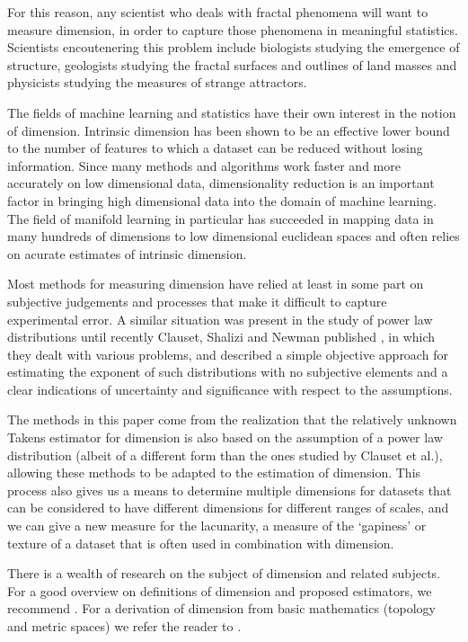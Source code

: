 \documentclass[11pt]{article}
\begin{document}
For this reason, any scientist who deals with fractal phenomena will want to measure dimension, in order to capture those phenomena in meaningful statistics. Scientists encoutenering this problem include biologists studying the emergence of structure, geologists studying the fractal surfaces and outlines of land masses and physicists studying the measures of strange attractors.

The fields of machine learning and statistics have their own interest in the notion of dimension. Intrinsic dimension has been shown to be an effective lower bound to the number of features to which a dataset can be reduced without losing information.\cite{kumaraswamy2008fractal} Since many methods and algorithms work faster and more accurately on low dimensional data, dimensionality reduction is an important factor in bringing high dimensional data into the domain of machine learning. The field of manifold learning in particular has succeeded in mapping data in many hundreds of dimensions to low dimensional euclidean spaces\cite{roweis2000nonlinear} and often relies on acurate estimates of intrinsic dimension.\cite{levina2004maximum} 

Most methods for measuring dimension have relied at least in some part on subjective judgements and processes that make it difficult to capture experimental error. A similar situation was present in the study of power law distributions until recently Clauset, Shalizi and Newman published \cite{clauset2007power}, in which they dealt with various problems, and described a simple objective approach for estimating the exponent of such distributions with no subjective elements and a clear indications of uncertainty and significance with respect to the assumptions.

The methods in this paper come from the realization that the relatively unknown Takens estimator for dimension is also based on the assumption of a power law distribution (albeit of a different form than the ones studied by Clauset et al.), allowing these methods to be adapted to the estimation of dimension. This process also gives us a means to determine multiple dimensions for datasets that can be considered to have different dimensions for different ranges of scales, and we can give a new measure for the lacunarity, a measure of the `gapiness' or texture of a dataset that is often used in combination with dimension. 

There is a wealth of research on the subject of dimension and related subjects. For a good overview on definitions of dimension and proposed estimators, we recommend \cite{theiler1990estimating}. For a derivation of dimension from basic mathematics (topology and metric spaces) we refer the reader to \cite{edgar2008measure}.
\end{document}
